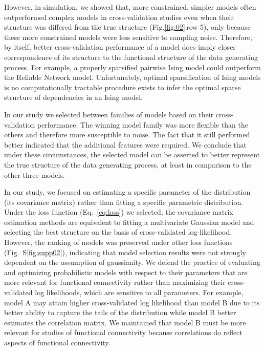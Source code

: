 \documentclass[10pt]{article}
\newcommand{\figref}[2]{Fig.\;\ref{fig:#1}\,#2}
\begin{document}
However, in simulation, we showed that, more constrained, simpler models often outperformed complex models in cross-validation studies even when their structure was differed from the true structure (\figref{02}{row 5}), only because these more constrained models were less sensitive to sampling noise. Therefore, by itself, better cross-validation performance of a model does imply closer correspondence of its structure to the functional structure of the data generating process. For example, a properly sparsified pairwise Ising model could outperform the Reliable Network model.  Unfortunately, optimal sparsification of Ising models is no computationally tractable procedure exists to infer the optimal sparse structure of dependencies in an Ising model.

In our study we selected between families of models based on their cross-validation performance. The winning model family was more flexible than the others and therefore more susceptible to noise. The fact that it still performed better indicated that the additional features were required. We conclude that under these circumstances, the selected model can be asserted to better represent the true structure of the data generating process, at least in comparison to the other three models.

In our study, we focused on estimating a specific parameter of the distribution (its covariance matrix) rather than fitting a specific parametric distribution.  Under the loss function (Eq.~\ref{eq:loss}) we selected, the covariance matrix estimation methods are equivalent to fitting a multivariate Gaussian model and selecting the best structure on the basis of cross-validated log-likelihood. However, the ranking of models was preserved under other loss functions (Fig.~S\ref{fig:supp02}), indicating that model selection results were not strongly dependent on the assumption of gaussianity. We defend the practice of evaluating and optimizing probabilistic models with respect to their parameters that are more relevant for functional connectivity rather than maximizing their cross-validated log likelihoods, which are sensitive to all parameters. For example, model A may attain higher cross-validated log likelihood than model B due to its better ability to capture the tails of the distribution while model B better estimates the correlation matrix. We maintained that model B must be more relevant for studies of functional connectivity because correlations do reflect aspects of functional connectivity. 
\end{document}
